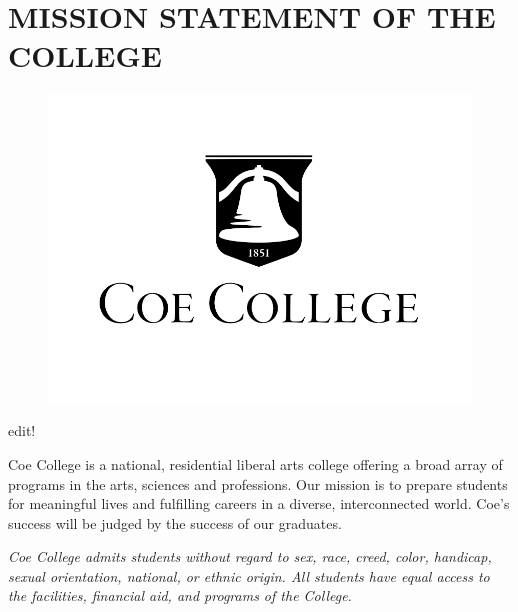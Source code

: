 \documentclass[
  letterpaper,
]{scrbook}
\begin{document}

\hypertarget{mission-statement-of-the-college}{%
\chapter*{MISSION STATEMENT OF THE
COLLEGE}\label{mission-statement-of-the-college}}


\begin{figure}

{\centering \includegraphics{catalog_sections/graphics/coe_bell.png}

}

\end{figure}


edit!

Coe College is a national, residential liberal arts college offering a
broad array of programs in the arts, sciences and professions. Our
mission is to prepare students for meaningful lives and fulfilling
careers in a diverse, interconnected world. Coe's success will be judged
by the success of our graduates.

\emph{Coe College admits students without regard to sex, race, creed,
color, handicap, sexual orientation, national, or ethnic origin. All
students have equal access to the facilities, financial aid, and
programs of the College.}

\end{document}
